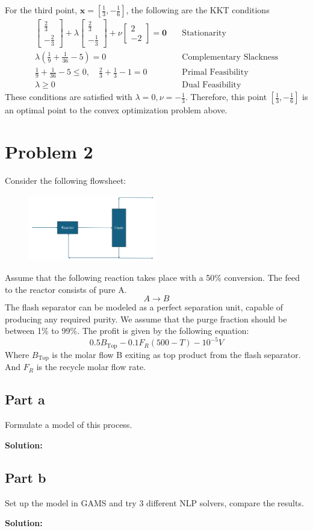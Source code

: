 \documentclass[11pt]{article}
\begin{document}
For the third point, $\textbf{x} = [\frac{1}{3}, -\frac{1}{6}]$, the following are the KKT conditions
\begin{align*}
  \begin{bmatrix}
    \frac{2}{3} \\ -\frac{2}{3}
  \end{bmatrix}
  +
  \lambda
  \begin{bmatrix}
    \frac{2}{3} \\ -\frac{1}{3}
  \end{bmatrix}
  +
  \nu
  \begin{bmatrix}
    2 \\ -2
  \end{bmatrix}
  = \textbf{0}
  & \quad \text{Stationarity} \\
  \lambda (\frac{1}{9} + \frac{1}{36} - 5) = 0 
  & \quad \text{Complementary Slackness} \\
  \frac{1}{9} + \frac{1}{36} - 5 \leq 0, \quad \frac{2}{3} + \frac{1}{3} - 1 = 0
  & \quad \text{Primal Feasibility} \\
  \lambda \geq 0 
  & \quad \text{Dual Feasibility}
\end{align*}
These conditions are satisfied with $\lambda=0, \nu=-\frac{1}{3}$.
Therefore, this point $[\frac{1}{3}, -\frac{1}{6}]$ is an optimal point to the convex optimization problem above.


\section{Problem 2}
Consider the following flowsheet:

\begin{figure}[htbp]
  \centerline{\includegraphics[width=0.5\textwidth]{images/flowsheet.png}}
  \label{fig:flowsheet}
\end{figure}

Assume that the following reaction takes place with a 50\% conversion. The feed to
the reactor consists of pure A.
\[ A \rightarrow B \]
The flash separator can be modeled as a perfect separation unit, capable of
producing any required purity.
We assume that the purge fraction should be between 1\% to 99\%.
The profit is given by the following equation:
\[ 0.5B_{\text{Top}} - 0.1F_R(500 - T) - 10^{-5}V \]
Where $B_{\text{Top}}$ is the molar flow B exiting as top product from the flash separator. 
And $F_R$ is the recycle molar flow rate.

\subsection{Part a}
Formulate a model of this process.

\textbf{Solution: }

\subsection{Part b}
Set up the model in GAMS and try 3 different NLP solvers, compare the results.

\textbf{Solution: }
\end{document}
